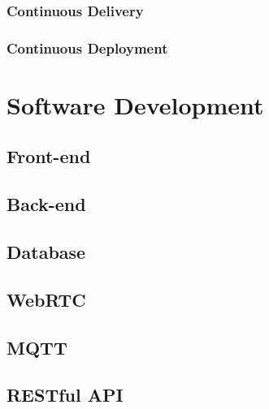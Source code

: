 \documentclass{article}
\begin{document}
        \subsubsection{Continuous Delivery}

        \subsubsection{Continuous Deployment}

\pagebreak

\section{Software Development} 

    \subsection{Front-end}

    \subsection{Back-end}

    \subsection{Database}

    \subsection{WebRTC}

    \subsection{MQTT}

    \subsection{RESTful API}
\end{document}
